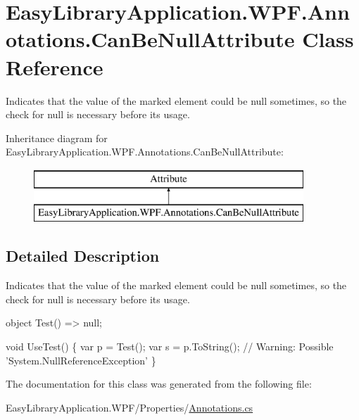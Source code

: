 \hypertarget{class_easy_library_application_1_1_w_p_f_1_1_annotations_1_1_can_be_null_attribute}{}\section{Easy\+Library\+Application.\+W\+P\+F.\+Annotations.\+Can\+Be\+Null\+Attribute Class Reference}
\label{class_easy_library_application_1_1_w_p_f_1_1_annotations_1_1_can_be_null_attribute}


Indicates that the value of the marked element could be {\ttfamily null} sometimes, so the check for {\ttfamily null} is necessary before its usage.  


Inheritance diagram for Easy\+Library\+Application.\+W\+P\+F.\+Annotations.\+Can\+Be\+Null\+Attribute\+:\begin{figure}[H]
\begin{center}
\leavevmode
\includegraphics[height=2.000000cm]{class_easy_library_application_1_1_w_p_f_1_1_annotations_1_1_can_be_null_attribute}
\end{center}
\end{figure}


\subsection{Detailed Description}
Indicates that the value of the marked element could be {\ttfamily null} sometimes, so the check for {\ttfamily null} is necessary before its usage. 


\begin{DoxyCode}
[CanBeNull] \textcolor{keywordtype}{object} Test() => null;

\textcolor{keywordtype}{void} UseTest() \{
  var p = Test();
  var s = p.ToString(); \textcolor{comment}{// Warning: Possible 'System.NullReferenceException'}
\}
\end{DoxyCode}


The documentation for this class was generated from the following file\+:\begin{DoxyCompactItemize}
\item 
Easy\+Library\+Application.\+W\+P\+F/\+Properties/\mbox{\hyperlink{_annotations_8cs}{Annotations.\+cs}}\end{DoxyCompactItemize}
